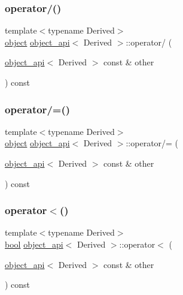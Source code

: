 \mbox{\label{classobject__api_a9b19ab413bd6077f45efeb6cff06b5c4}} 
\subsubsection{\texorpdfstring{operator/()}{operator/()}}
{\footnotesize\ttfamily template$<$typename Derived$>$ \\
\mbox{\hyperlink{classobject}{object}} \mbox{\hyperlink{classobject__api}{object\+\_\+api}}$<$ Derived $>$\+::operator/ (\begin{DoxyParamCaption}\item[{\mbox{\hyperlink{classobject__api}{object\+\_\+api}}$<$ Derived $>$ const \&}]{other }\end{DoxyParamCaption}) const}

\mbox{\label{classobject__api_a4b9e5ae02327c2ff44e25dc0f1168e64}} 
\subsubsection{\texorpdfstring{operator/=()}{operator/=()}}
{\footnotesize\ttfamily template$<$typename Derived$>$ \\
\mbox{\hyperlink{classobject}{object}} \mbox{\hyperlink{classobject__api}{object\+\_\+api}}$<$ Derived $>$\+::operator/= (\begin{DoxyParamCaption}\item[{\mbox{\hyperlink{classobject__api}{object\+\_\+api}}$<$ Derived $>$ const \&}]{other }\end{DoxyParamCaption}) const}

\mbox{\label{classobject__api_a31c5855f0468b7e83584997a9ccb48bf}} 
\subsubsection{\texorpdfstring{operator$<$()}{operator<()}}
{\footnotesize\ttfamily template$<$typename Derived$>$ \\
\mbox{\hyperlink{asdl_8h_af6a258d8f3ee5206d682d799316314b1}{bool}} \mbox{\hyperlink{classobject__api}{object\+\_\+api}}$<$ Derived $>$\+::operator$<$ (\begin{DoxyParamCaption}\item[{\mbox{\hyperlink{classobject__api}{object\+\_\+api}}$<$ Derived $>$ const \&}]{other }\end{DoxyParamCaption}) const\hspace{0.3cm}{\ttfamily [inline]}}

